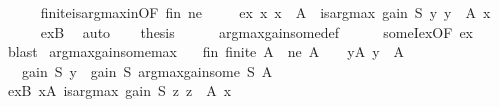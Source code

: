 \begin{isabellebody}
\ \ \ \ \isamarkupfalse%
\ finite{\isacharunderscore}{\kern0pt}is{\isacharunderscore}{\kern0pt}arg{\isacharunderscore}{\kern0pt}max{\isacharunderscore}{\kern0pt}in{\isacharbrackleft}{\kern0pt}OF\ fin\ ne{\isacharbrackright}{\kern0pt}\ \isakeywordONE{{\isachardot}{\kern0pt}}\isamarkupfalse%
\isanewline
\isanewline
\ \ \isamarkupfalse%
\ ex{\isacharcolon}{\kern0pt}\ {\isachardoublequoteopen}{\isasymexists}x{\isachardot}{\kern0pt}\ x\ {\isasymin}\ A\ {\isasymand}\ is{\isacharunderscore}{\kern0pt}arg{\isacharunderscore}{\kern0pt}max\ {\isacharparenleft}{\kern0pt}gain\ S{\isacharparenright}{\kern0pt}\ {\isacharparenleft}{\kern0pt}{\isasymlambda}y{\isachardot}{\kern0pt}\ y\ {\isasymin}\ A{\isacharparenright}{\kern0pt}\ x{\isachardoublequoteclose}\isanewline
\ \ \ \ \isamarkupfalse%
\ exB\ \isamarkupfalse%
\ auto\isanewline
\isanewline
\ \ \isamarkupfalse%
\ {\isacharquery}{\kern0pt}thesis\isanewline
\ \ \ \ \isamarkupfalse%
\ argmax{\isacharunderscore}{\kern0pt}gain{\isacharunderscore}{\kern0pt}some{\isacharunderscore}{\kern0pt}def\isanewline
\ \ \ \ \isamarkupfalse%
\ someI{\isacharunderscore}{\kern0pt}ex{\isacharbrackleft}{\kern0pt}OF\ ex{\isacharbrackright}{\kern0pt}\ \isamarkupfalse%
\ blast\isanewline
{}\isamarkupfalse%
%
\endisatagproof
{\isafoldproof}%
%
\isadelimproof
\isanewline
%
\endisadelimproof
\isanewline
{}\isamarkupfalse%
\ argmax{\isacharunderscore}{\kern0pt}gain{\isacharunderscore}{\kern0pt}some{\isacharunderscore}{\kern0pt}max{\isacharcolon}{\kern0pt}\isanewline
\ \ \ fin{\isacharcolon}{\kern0pt}\ {\isachardoublequoteopen}finite\ A{\isachardoublequoteclose}\ \ ne{\isacharcolon}{\kern0pt}\ {\isachardoublequoteopen}A\ {\isasymnoteq}\ {\isacharbraceleft}{\kern0pt}{\isacharbraceright}{\kern0pt}{\isachardoublequoteclose}\ \ yA{\isacharcolon}{\kern0pt}\ {\isachardoublequoteopen}y\ {\isasymin}\ A{\isachardoublequoteclose}\isanewline
\ \ \ {\isachardoublequoteopen}gain\ S\ y\ {\isasymle}\ gain\ S\ {\isacharparenleft}{\kern0pt}argmax{\isacharunderscore}{\kern0pt}gain{\isacharunderscore}{\kern0pt}some\ S\ A{\isacharparenright}{\kern0pt}{\isachardoublequoteclose}\isanewline
%
\isadelimproof
%
\endisadelimproof
%
\isatagproof
{}\isamarkupfalse%
\ {\isacharminus}{\kern0pt}\isanewline
\ \ \isamarkupfalse%
\ exB{\isacharcolon}{\kern0pt}\ {\isachardoublequoteopen}{\isasymexists}x{\isasymin}A{\isachardot}{\kern0pt}\ is{\isacharunderscore}{\kern0pt}arg{\isacharunderscore}{\kern0pt}max\ {\isacharparenleft}{\kern0pt}gain\ S{\isacharparenright}{\kern0pt}\ {\isacharparenleft}{\kern0pt}{\isasymlambda}z{\isachardot}{\kern0pt}\ z\ {\isasymin}\ A{\isacharparenright}{\kern0pt}\ x{\isachardoublequoteclose}\isanewline

\end{isabellebody}
